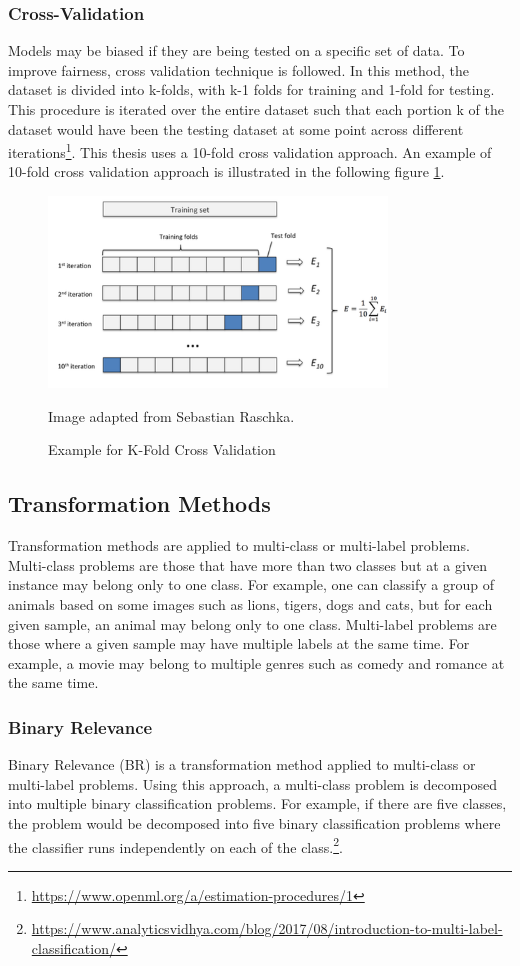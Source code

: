 \documentclass[a4paper,12pt,twoside]{report}
\begin{document}
\subsubsection{Cross-Validation} 
Models may be biased if they are being tested on a specific set of data. To improve fairness, cross validation technique is followed. In this method, the dataset is divided into k-folds, with k-1 folds for training and 1-fold for testing. This procedure is iterated over the entire dataset such that each portion k of the dataset would have been the testing dataset at some point across different iterations\footnote{\url{https://www.openml.org/a/estimation-procedures/1}}. This thesis uses a 10-fold cross validation approach. An example of 10-fold cross validation approach is illustrated in the following figure \ref{fig:k-fold}.
\begin{figure}[h] %
    \centering
    \includegraphics[width=9cm]{k-fold}
    \caption{Example for K-Fold Cross Validation}
    \small Image adapted from Sebastian Raschka\footnotemark.
    \label{fig:k-fold}
\end{figure}

\subsection{Transformation Methods}
Transformation methods are applied to multi-class or multi-label problems. Multi-class problems are those that have more than two classes but at a given instance may belong only to one class. For example, one can classify a group of animals based on some images such as lions, tigers, dogs and cats, but for each given sample, an animal may belong only to one class. Multi-label problems are those where a given sample may have multiple labels at the same time. For example, a movie may belong to multiple genres such as comedy and romance at the same time. 

\subsubsection{Binary Relevance} 
Binary Relevance (\acs{BR}) is a transformation method applied to multi-class or multi-label problems. Using this approach, a multi-class problem is decomposed into multiple binary classification problems. For example, if there are five classes, the problem would be decomposed into five binary classification problems where the classifier runs independently on each of the class.\footnote{\url{https://www.analyticsvidhya.com/blog/2017/08/introduction-to-multi-label-classification/}}. 
\end{document}
